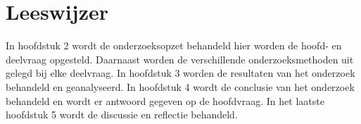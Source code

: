 \section{Leeswijzer}
In hoofdstuk 2 wordt de onderzoeksopzet behandeld hier worden de hoofd- en deelvraag opgesteld.
Daarnaast worden de verschillende onderzoeksmethoden uit gelegd bij elke deelvraag.
In hoofdstuk 3 worden de resultaten van het onderzoek behandeld en geanalyseerd.
In hoofdstuk 4 wordt de conclusie van het onderzoek behandeld en wordt er antwoord gegeven op de hoofdvraag.
In het laatste hoofdstuk 5 wordt de discussie en reflectie behandeld.
